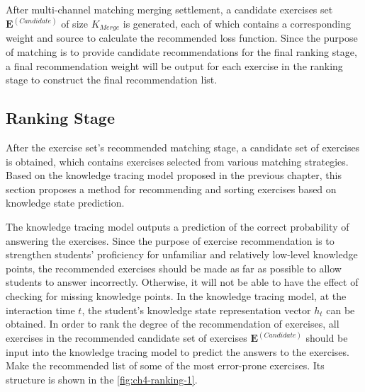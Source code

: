 
After multi-channel matching merging settlement, a candidate exercises set \(\mathbf{E}^{(Candidate)}\) of size \(K_{Merge}\) is generated, each of which contains a corresponding weight and source to calculate the recommended loss function. Since the purpose of matching is to provide candidate recommendations for the final ranking stage, a final recommendation weight will be output for each exercise in the ranking stage to construct the final recommendation list.

\subsection{Ranking Stage}


After the exercise set's recommended matching stage, a candidate set of exercises is obtained, which contains exercises selected from various matching strategies. Based on the knowledge tracing model proposed in the previous chapter, this section proposes a method for recommending and sorting exercises based on knowledge state prediction.

The knowledge tracing model outputs a prediction of the correct probability of answering the exercises. Since the purpose of exercise recommendation is to strengthen students' proficiency for unfamiliar and relatively low-level knowledge points, the recommended exercises should be made as far as possible to allow students to answer incorrectly. Otherwise, it will not be able to have the effect of checking for missing knowledge points. In the knowledge tracing model, at the interaction time \(t\), the student's knowledge state representation vector \(h_t\) can be obtained. In order to rank the degree of the recommendation of exercises, all exercises in the recommended candidate set of exercises \(\mathbf{E}^{(Candidate)}\) should be input into the knowledge tracing model to predict the answers to the exercises. Make the recommended list of some of the most error-prone exercises. Its structure is shown in the \figurename{\ref{fig:ch4-ranking-1}}.

